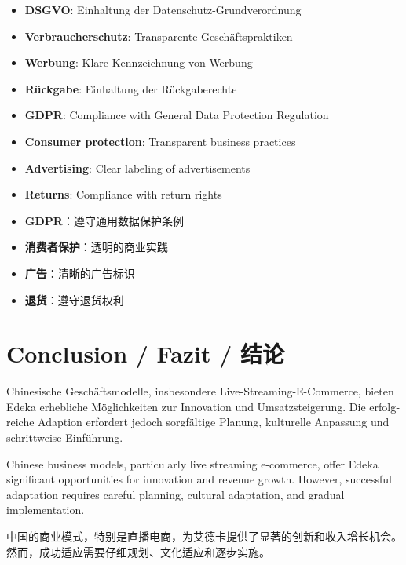 \begin{otherlanguage}{ngerman}
\begin{itemize}
    \item \textbf{DSGVO}: Einhaltung der Datenschutz-Grundverordnung
    \item \textbf{Verbraucherschutz}: Transparente Geschäftspraktiken
    \item \textbf{Werbung}: Klare Kennzeichnung von Werbung
    \item \textbf{Rückgabe}: Einhaltung der Rückgaberechte
\end{itemize}
\end{otherlanguage}

\begin{itemize}
    \item \textbf{GDPR}: Compliance with General Data Protection Regulation
    \item \textbf{Consumer protection}: Transparent business practices
    \item \textbf{Advertising}: Clear labeling of advertisements
    \item \textbf{Returns}: Compliance with return rights
\end{itemize}

\begin{itemize}
    \item \textbf{GDPR}：遵守通用数据保护条例
    \item \textbf{消费者保护}：透明的商业实践
    \item \textbf{广告}：清晰的广告标识
    \item \textbf{退货}：遵守退货权利
\end{itemize}

\section{Conclusion / Fazit / 结论}

\begin{otherlanguage}{ngerman}
Chinesische Geschäftsmodelle, insbesondere Live-Streaming-E-Commerce, bieten Edeka erhebliche Möglichkeiten zur Innovation und Umsatzsteigerung. Die erfolgreiche Adaption erfordert jedoch sorgfältige Planung, kulturelle Anpassung und schrittweise Einführung.
\end{otherlanguage}

Chinese business models, particularly live streaming e-commerce, offer Edeka significant opportunities for innovation and revenue growth. However, successful adaptation requires careful planning, cultural adaptation, and gradual implementation.

中国的商业模式，特别是直播电商，为艾德卡提供了显著的创新和收入增长机会。然而，成功适应需要仔细规划、文化适应和逐步实施。
